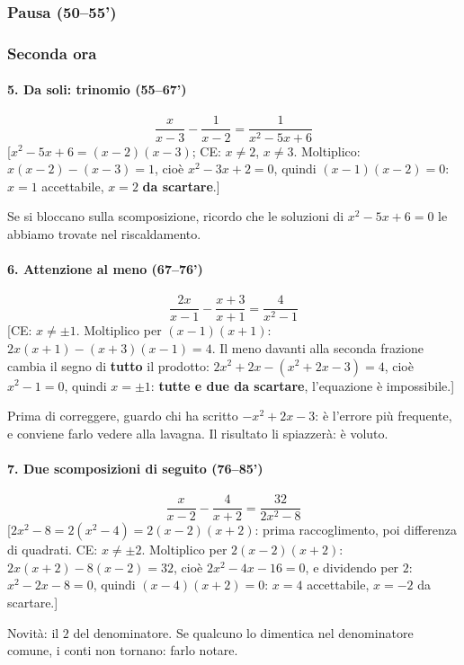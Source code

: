 \documentclass[11pt]{report}
\begin{document}
\subsubsection*{Pausa (50--55')}

\subsubsection*{Seconda ora}

\paragraph{5. Da soli: trinomio (55--67')}
$$
\frac{x}{x-3}-\frac{1}{x-2}=\frac{1}{x^2-5x+6}
$$
[$x^2-5x+6=(x-2)(x-3)$; CE: $x\neq2$, $x\neq3$. Moltiplico: $x(x-2)-(x-3)=1$, cioè $x^2-3x+2=0$, quindi $(x-1)(x-2)=0$: $x=1$ accettabile, $x=2$ \textbf{da scartare}.]

Se si bloccano sulla scomposizione, ricordo che le soluzioni di $x^2-5x+6=0$ le abbiamo trovate nel riscaldamento.

\paragraph{6. Attenzione al meno (67--76')}
$$
\frac{2x}{x-1}-\frac{x+3}{x+1}=\frac{4}{x^2-1}
$$
[CE: $x\neq\pm1$. Moltiplico per $(x-1)(x+1)$: $2x(x+1)-(x+3)(x-1)=4$. Il meno davanti alla seconda frazione cambia il segno di \textbf{tutto} il prodotto: $2x^2+2x-(x^2+2x-3)=4$, cioè $x^2-1=0$, quindi $x=\pm1$: \textbf{tutte e due da scartare}, l'equazione è impossibile.]

Prima di correggere, guardo chi ha scritto $-x^2+2x-3$: è l'errore più frequente, e conviene farlo vedere alla lavagna. Il risultato  li spiazzerà: è voluto.

\paragraph{7. Due scomposizioni di seguito (76--85')}
$$
\frac{x}{x-2}-\frac{4}{x+2}=\frac{32}{2x^2-8}
$$
[$2x^2-8=2(x^2-4)=2(x-2)(x+2)$: prima raccoglimento, poi differenza di quadrati. CE: $x\neq\pm2$. Moltiplico per $2(x-2)(x+2)$: $2x(x+2)-8(x-2)=32$, cioè $2x^2-4x-16=0$, e dividendo per $2$: $x^2-2x-8=0$, quindi $(x-4)(x+2)=0$: $x=4$ accettabile, $x=-2$ da scartare.]

Novità: il $2$ del denominatore. Se qualcuno lo dimentica nel denominatore comune, i conti non tornano: farlo notare.
\end{document}

